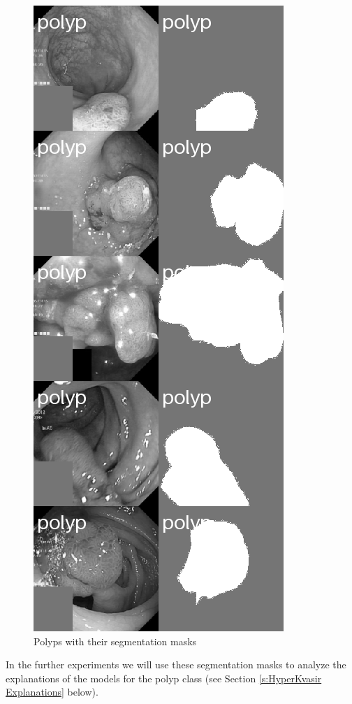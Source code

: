 \documentclass[magisterska,en]{pracamgr}
\begin{document}
\begin{figure}[H]
\centering
\includegraphics[scale=0.5]{./images/polyps_segmentation.png}
\caption{Polyps with their segmentation masks}
\label{polyps_segmentation}
\end{figure}

In the further experiments we will use these segmentation masks to analyze the explanations of the models for the polyp class (see Section \ref{s:HyperKvasir Explanations} below).
\end{document}

